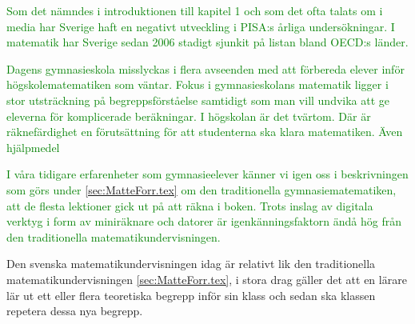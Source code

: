 
\textcolor{green}{Som det nämndes i introduktionen till kapitel 1 och som det ofta talats om i media \cite{pisaImedia} har Sverige haft en negativt utveckling i PISA:s årliga undersökningar. I matematik har Sverige sedan 2006 stadigt sjunkit på listan bland OECD:s länder.}

\textcolor{green}{Dagens gymnasieskola misslyckas i flera avseenden med att förbereda elever inför högskolematematiken som väntar. Fokus i gymnasieskolans matematik ligger i stor utsträckning på begreppsförståelse samtidigt som man vill undvika att ge eleverna för komplicerade beräkningar. I högskolan är det tvärtom. Där är räknefärdighet en förutsättning för att studenterna ska klara matematiken. Även hjälpmedel}


\textcolor{green}{I våra tidigare erfarenheter som gymnasieelever känner vi igen oss i beskrivningen som görs under \ref{sec:MatteForr.tex} om den traditionella gymnasiematematiken, att de flesta lektioner gick ut på att räkna i boken. Trots inslag av digitala verktyg i form av miniräknare och datorer är igenkänningsfaktorn ändå hög från den traditionella matematikundervisningen.}

\textcolor{WildStrawberry}{
    Den svenska matematikundervisningen idag är relativt lik den traditionella matematikundervisningen \ref{sec:MatteForr.tex}, i stora drag gäller det att en lärare lär ut ett eller flera teoretiska begrepp inför sin klass och sedan ska klassen repetera dessa nya begrepp. }
    
